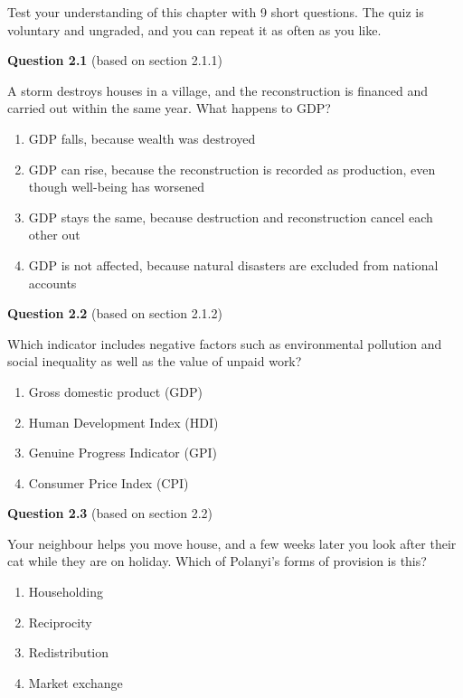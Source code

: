 \documentclass[
  british,
  a4paper,
  DIV=11,
  numbers=noendperiod,
  oneside,
  openany]{scrreprt}
\providecommand{\tightlist}{%
  \setlength{\itemsep}{0pt}\setlength{\parskip}{0pt}}
\begin{document}
Test your understanding of this chapter with 9 short questions. The quiz
is voluntary and ungraded, and you can repeat it as often as you like.

\textbf{Question 2.1} (based on section 2.1.1)

A storm destroys houses in a village, and the reconstruction is financed
and carried out within the same year. What happens to GDP?

\begin{enumerate}
\def\labelenumi{\alph{enumi})}
\tightlist
\item
  GDP falls, because wealth was destroyed
\item
  GDP can rise, because the reconstruction is recorded as production,
  even though well-being has worsened
\item
  GDP stays the same, because destruction and reconstruction cancel each
  other out
\item
  GDP is not affected, because natural disasters are excluded from
  national accounts
\end{enumerate}

\textbf{Question 2.2} (based on section 2.1.2)

Which indicator includes negative factors such as environmental
pollution and social inequality as well as the value of unpaid work?

\begin{enumerate}
\def\labelenumi{\alph{enumi})}
\tightlist
\item
  Gross domestic product (GDP)
\item
  Human Development Index (HDI)
\item
  Genuine Progress Indicator (GPI)
\item
  Consumer Price Index (CPI)
\end{enumerate}

\textbf{Question 2.3} (based on section 2.2)

Your neighbour helps you move house, and a few weeks later you look
after their cat while they are on holiday. Which of Polanyi's forms of
provision is this?

\begin{enumerate}
\def\labelenumi{\alph{enumi})}
\tightlist
\item
  Householding
\item
  Reciprocity
\item
  Redistribution
\item
  Market exchange
\end{enumerate}
\end{document}

